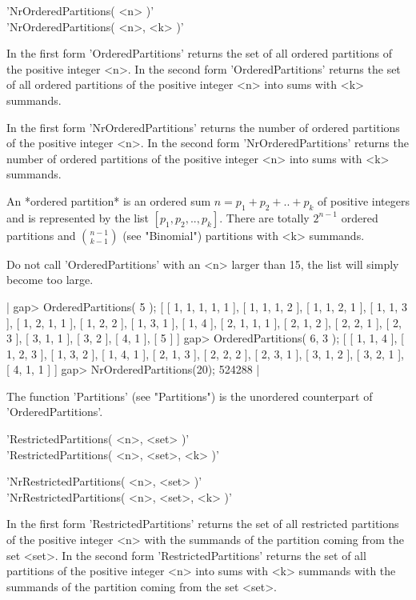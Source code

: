 'NrOrderedPartitions( <n> )' \\
'NrOrderedPartitions( <n>, <k> )'

In the  first  form 'OrderedPartitions'  returns the  set  of all ordered
partitions  of  the  positive    integer  <n>.    In  the   second   form
'OrderedPartitions' returns the  set  of  all ordered partitions  of  the
positive integer <n> into sums with <k> summands.

In the first form  'NrOrderedPartitions'  returns the number of   ordered
partitions  of  the   positive   integer   <n>.   In the    second   form
'NrOrderedPartitions' returns  the number  of ordered  partitions  of the
positive integer <n> into sums with <k> summands.

An *ordered partition* is an ordered sum $n = p_1 + p_2 + ..   +  p_k$ of
positive integers and is represented by the list $[ p_1, p_2, .., p_k ]$.
There are  totally $2^{n-1}$ ordered  partitions  and ${n-1 \choose k-1}$
(see "Binomial") partitions with <k> summands.

Do not call 'OrderedPartitions' with an <n>  larger  than  15,  the  list
will simply become too large.

|    gap> OrderedPartitions( 5 );
    [ [ 1, 1, 1, 1, 1 ], [ 1, 1, 1, 2 ], [ 1, 1, 2, 1 ], [ 1, 1, 3 ],
      [ 1, 2, 1, 1 ], [ 1, 2, 2 ], [ 1, 3, 1 ], [ 1, 4 ], [ 2, 1, 1, 1 ],
      [ 2, 1, 2 ], [ 2, 2, 1 ], [ 2, 3 ], [ 3, 1, 1 ], [ 3, 2 ], 
      [ 4, 1 ], [ 5 ] ]
    gap> OrderedPartitions( 6, 3 );
    [ [ 1, 1, 4 ], [ 1, 2, 3 ], [ 1, 3, 2 ], [ 1, 4, 1 ], [ 2, 1, 3 ],
      [ 2, 2, 2 ], [ 2, 3, 1 ], [ 3, 1, 2 ], [ 3, 2, 1 ], [ 4, 1, 1 ] ]
    gap> NrOrderedPartitions(20);
    524288 |

The function 'Partitions' (see "Partitions") is the unordered counterpart
of 'OrderedPartitions'.

%
%

'RestrictedPartitions( <n>, <set> )' \\
'RestrictedPartitions( <n>, <set>, <k> )'

'NrRestrictedPartitions( <n>, <set> )' \\
'NrRestrictedPartitions( <n>, <set>, <k> )'

In the   first  form  'RestrictedPartitions'   returns   the set   of all
restricted  partitions of the positive integer  <n>  with the summands of
the   partition  coming  from the    set  <set>.   In    the second  form
'RestrictedPartitions' returns the set of all  partitions of the positive
integer <n> into   sums  with <k>  summands   with the summands  of   the
partition coming from the set <set>.

